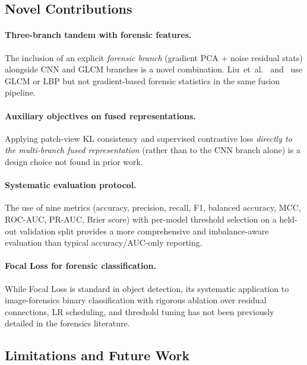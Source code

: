 \documentclass[10pt,twocolumn]{article}
\begin{document}
\subsection{Novel Contributions}

\paragraph{Three-branch tandem with forensic features.}
The inclusion of an explicit \emph{forensic branch} (gradient PCA +
noise residual stats) alongside CNN and GLCM branches is a novel
combination.
Liu~et~al.~\cite{liu2020gram} and~\cite{frontiers2025multimodal}
use GLCM or LBP but not gradient-based forensic statistics in
the same fusion pipeline.

\paragraph{Auxiliary objectives on fused representations.}
Applying patch-view KL consistency and supervised contrastive loss
\emph{directly to the multi-branch fused representation} (rather than
to the CNN branch alone) is a design choice not found in prior work.

\paragraph{Systematic evaluation protocol.}
The use of nine metrics (accuracy, precision, recall, F1, balanced
accuracy, MCC, ROC-AUC, PR-AUC, Brier score) with per-model
threshold selection on a held-out validation split provides a more
comprehensive and imbalance-aware evaluation than typical
accuracy/AUC-only reporting.

\paragraph{Focal Loss for forensic classification.}
While Focal Loss is standard in object detection, its systematic
application to image-forensics binary classification with rigorous
ablation over residual connections, LR scheduling, and threshold
tuning has not been previously detailed in the forensics literature.

\subsection{Limitations and Future Work}
\end{document}
